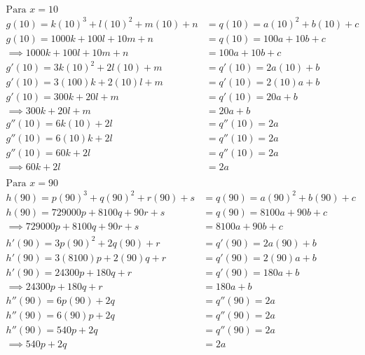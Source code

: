 \begin{align*}
	\text{Para }x=10                                                      \\
	g(10)  = k(10)^3 + l(10)^2 + m(10) + n & =q(10) = a(10)^2 + b(10) + c \\
	g(10)  = 1000k + 100l + 10m + n        & =q(10) = 100a + 10b + c      \\
	\implies 1000k + 100l + 10m + n        & =100a + 10b + c              \\
	g'(10) =3k(10)^2 + 2l(10) + m          & =q'(10) =2a(10) + b          \\
	g'(10) =3(100)k + 2(10)l + m           & =q'(10) =2(10)a + b          \\
	g'(10) =300k + 20l + m                 & =q'(10) =20a + b             \\
	\implies 300k + 20l + m                & =20a + b                     \\
	g''(10)=6k(10)+2l                      & =q''(10)=2a                  \\
	g''(10)=6(10)k+2l                      & =q''(10)=2a                  \\
	g''(10)=60k+2l                         & =q''(10)=2a                  \\
	\implies 60k+2l                        & =2a                          \\
\end{align*}
\begin{align*}
	\text{Para }x=90                                                     \\
	h(90) = p(90)^3 + q(90)^2 + r(90) + s & =q(90) = a(90)^2 + b(90) + c \\
	h(90) = 729000p + 8100q + 90r + s     & =q(90) = 8100a + 90b + c     \\
	\implies 729000p + 8100q + 90r + s    & = 8100a + 90b + c            \\
	h'(90) =3p(90)^2 + 2q(90) + r         & =q'(90) =2a(90) + b          \\
	h'(90) =3(8100)p + 2(90)q + r         & =q'(90) =2(90)a + b          \\
	h'(90) =24300p + 180q + r             & =q'(90) =180a + b            \\
	\implies 24300p + 180q + r            & =180a + b                    \\
	h''(90)=6p(90)+2q                     & =q''(90)=2a                  \\
	h''(90)=6(90)p+2q                     & =q''(90)=2a                  \\
	h''(90)=540p+2q                       & =q''(90)=2a                  \\
	\implies 540p+2q                      & =2a                          \\
\end{align*}

